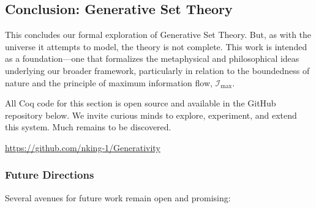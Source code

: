 \documentclass[12pt]{article}
\begin{document}


\subsection{Conclusion: Generative Set Theory}

This concludes our formal exploration of Generative Set Theory. But, as with the universe it attempts to model, the theory is not complete. This work is intended as a foundation—one that formalizes the metaphysical and philosophical ideas underlying our broader framework, particularly in relation to the boundedness of nature and the principle of maximum information flow, \( \mathcal{I}_{\text{max}} \).

All Coq code for this section is open source and available in the GitHub repository below. We invite curious minds to explore, experiment, and extend this system. Much remains to be discovered.

\begin{center}
    \url{https://github.com/nking-1/Generativity}
\end{center}

\subsubsection{Future Directions}

Several avenues for future work remain open and promising:
\end{document}
